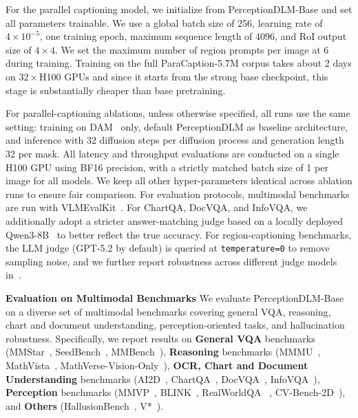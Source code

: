For the parallel captioning model, we initialize from PerceptionDLM-Base and set all parameters trainable. We use a global batch size of 256, learning rate of $4\times10^{-5}$, one training epoch, maximum sequence length of 4096, and RoI output size of $4\times4$. We set the maximum number of region prompts per image at 6 during training. Training on the full ParaCaption-5.7M corpus takes about 2 days on $32\times$H100 GPUs and since it starts from the strong base checkpoint, this stage is substantially cheaper than base pretraining.

For parallel-captioning ablations, unless otherwise specified, all runs use the same setting: training on DAM~\citep{lian2025describe} only, default PerceptionDLM as baseline architecture, and inference with 32 diffusion steps per diffusion process and generation length 32 per mask.
%
All latency and throughput evaluations are conducted on a single H100 GPU using BF16 precision, with a strictly matched batch size of 1 per image for all models. We keep all other hyper-parameters identical across ablation runs to ensure fair comparison.
%
For evaluation protocols, multimodal benchmarks are run with VLMEvalKit~\citep{duan2024vlmevalkit}. For ChartQA, DocVQA, and InfoVQA, we additionally adopt a stricter answer-matching judge based on a locally deployed Qwen3-8B~\citep{yang2025qwen3} to better reflect the true accuracy. For region-captioning benchmarks, the LLM judge (GPT-5.2 by default) is queried at \texttt{temperature=0} to remove sampling noise, and we further report robustness across different judge models in~.

\noindent
\textbf{Evaluation on Multimodal Benchmarks} We evaluate PerceptionDLM-Base on a diverse set of multimodal benchmarks covering general VQA, reasoning, chart and document understanding, perception-oriented tasks, and hallucination robustness. Specifically, we report results on \textbf{General VQA} benchmarks (MMStar~\citep{chen2024mmstar}, SeedBench~\citep{li2023seedbench}, MMBench~\citep{liu2024mmbench}), \textbf{Reasoning} benchmarks (MMMU~\citep{yue2023mmmu}, MathVista~\citep{lu2023mathvista}, MathVerse-Vision-Only~\citep{zhang2024mathverse}), \textbf{OCR, Chart and Document Understanding} benchmarks (AI2D~\citep{kembhavi2016ai2d}, ChartQA~\citep{masry2022chartqa}, DocVQA~\citep{mathew2021docvqa}, InfoVQA~\citep{mathew2021infographicvqa}), \textbf{Perception} benchmarks (MMVP~\citep{tong2024mmvp}, BLINK~\citep{fu2024blink}, RealWorldQA~\citep{xai2024realworldqa} , CV-Bench-2D~\citep{tong2024cambrian}), and \textbf{Others} (HallusionBench~\citep{guan2023hallusionbench}, V*~\citep{wu2023vstar}).

